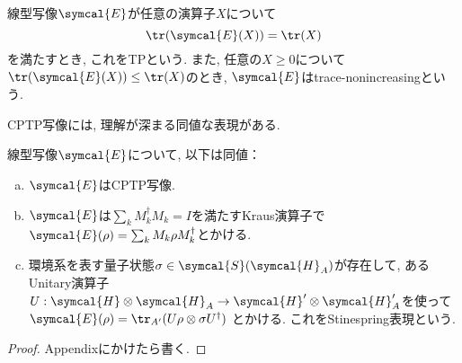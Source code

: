 \begin{mydfn}[TP写像]\label{dfn.TP-map}
  線型写像$\symcal{E}$が任意の演算子$X$について
  \begin{equation}
    \tr(\symcal{E}(X))=\tr(X)
  \end{equation}
  を満たすとき, これをTPという. 
  また, 任意の$X\geq 0$について$\tr(\symcal{E}(X))\leq\tr(X)$のとき, $\symcal{E}$はtrace-nonincreasingという. 
\end{mydfn}

CPTP写像には, 理解が深まる同値な表現がある. 

\begin{mythm}[CPTP写像の同値な表現]\label{thm.CPTP-map}
  線型写像$\symcal{E}$について, 以下は同値：
  \begin{enumerate}[(a). ]
    \item $\symcal{E}$はCPTP写像. 
    \item $\symcal{E}$は$\sum_{k}M_k^{\dag}M_k=I$を満たすKraus演算子で$\symcal{E}(\rho)=\sum_{k}M_k\rho M_k^{\dag}$とかける. 
    \item 環境系を表す量子状態$\sigma\in\symcal{S}(\symcal{H}_A)$が存在して, あるUnitary演算子$U:\symcal{H}\otimes \symcal{H}_A\to \symcal{H}'\otimes \symcal{H}_A'$を使って
      $\symcal{E}(\rho)=\tr_{A'}(U\rho\otimes\sigma U^{\dag})$
    とかける. 
    これをStinespring表現という. 
  \end{enumerate}
\end{mythm}

\begin{proof}
  Appendixにかけたら書く. 
\end{proof}